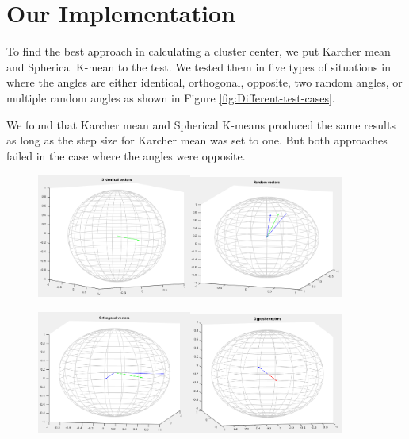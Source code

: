 \documentclass[../tech_report_1.tex]{subfiles}
\begin{document}
\section*{Our Implementation}

To find the best approach in calculating a cluster center, we put
Karcher mean and Spherical K-mean to the test. We tested them in five
types of situations in where the angles are either identical, orthogonal,
opposite, two random angles, or multiple random angles as shown in
Figure \ref{fig:Different-test-cases}. 

We found that Karcher mean and Spherical K-means produced the same
results as long as the step size for Karcher mean was set to one.
But both approaches failed in the case where the angles were opposite. 

\begin{figure}[ht]
\begin{centering}
\includegraphics[width=2in]{fig1}\includegraphics[width=2in]{fig2} 
\par\end{centering}

\begin{centering}
\includegraphics[width=2in]{fig3}\includegraphics[width=2in]{fig4}
\par\end{centering}


\end{figure}
\end{document}
